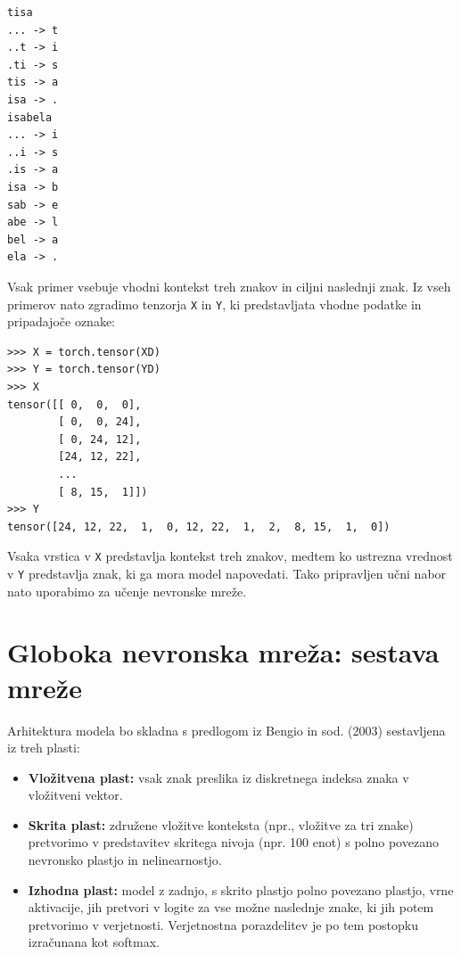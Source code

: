 \vspace*{3mm}
\begin{lstlisting}
tisa
... -> t
..t -> i
.ti -> s
tis -> a
isa -> .
isabela
... -> i
..i -> s
.is -> a
isa -> b
sab -> e
abe -> l
bel -> a
ela -> .
\end{lstlisting}

Vsak primer vsebuje vhodni kontekst treh znakov in ciljni naslednji znak. Iz vseh primerov nato zgradimo tenzorja \texttt{X} in \texttt{Y}, ki predstavljata vhodne podatke in pripadajoče oznake:

\vspace*{3mm}
\begin{lstlisting}
>>> X = torch.tensor(XD)
>>> Y = torch.tensor(YD)
>>> X
tensor([[ 0,  0,  0],
        [ 0,  0, 24],
        [ 0, 24, 12],
        [24, 12, 22],
        ...
        [ 8, 15,  1]])
>>> Y
tensor([24, 12, 22,  1,  0, 12, 22,  1,  2,  8, 15,  1,  0])
\end{lstlisting}

Vsaka vrstica v \texttt{X} predstavlja kontekst treh znakov, medtem ko ustrezna vrednost v \texttt{Y} predstavlja znak, ki ga mora model napovedati. Tako pripravljen učni nabor nato uporabimo za učenje nevronske mreže.

\section{Globoka nevronska mreža: sestava mreže}

Arhitektura modela bo skladna s predlogom iz Bengio in sod. (2003) sestavljena iz treh plasti:
\begin{itemize}
    \item \textbf{Vložitvena plast:} vsak znak preslika iz diskretnega indeksa znaka v vložitveni vektor.
    
    \item \textbf{Skrita plast:} združene vložitve konteksta (npr., vložitve za tri znake) pretvorimo v predstavitev skritega nivoja (npr. 100 enot) s polno povezano nevronsko plastjo in nelinearnostjo.
    
    \item \textbf{Izhodna plast:} model z zadnjo, s skrito plastjo polno povezano plastjo, vrne aktivacije, jih pretvori v logite za vse možne naslednje znake, ki jih potem pretvorimo v verjetnosti. Verjetnostna porazdelitev je po tem postopku izračunana kot softmax.
\end{itemize}

